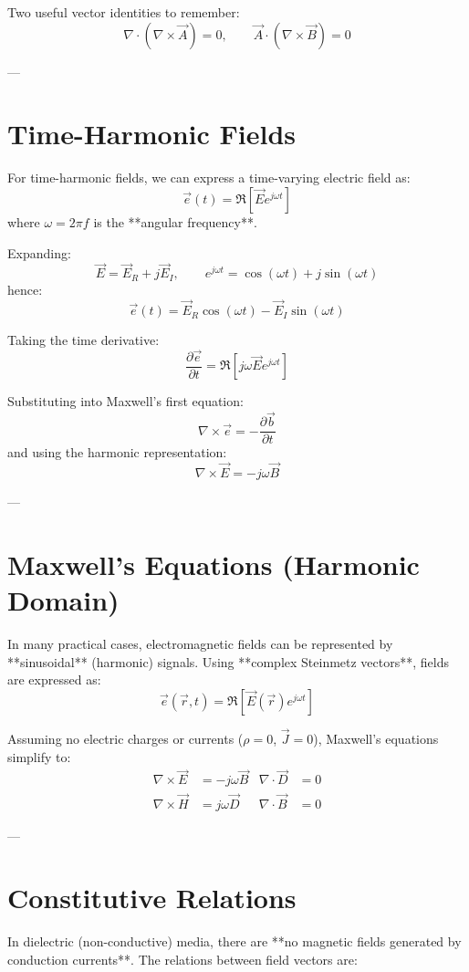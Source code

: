 Two useful vector identities to remember:
\[
\nabla \cdot (\nabla \times \vec{A}) = 0,
\qquad
\vec{A} \cdot (\nabla \times \vec{B}) = 0
\]

---

\section*{Time-Harmonic Fields}

For time-harmonic fields, we can express a time-varying electric field as:
\[
\vec{e}(t) = \Re \left[ \vec{E} e^{j\omega t} \right]
\]
where $\omega = 2\pi f$ is the **angular frequency**.

Expanding:
\[
\vec{E} = \vec{E}_R + j\vec{E}_I, \qquad
e^{j\omega t} = \cos(\omega t) + j\sin(\omega t)
\]
hence:
\[
\vec{e}(t) = \vec{E}_R \cos(\omega t) - \vec{E}_I \sin(\omega t)
\]

Taking the time derivative:
\[
\frac{\partial \vec{e}}{\partial t} = 
\Re \left[ j\omega \vec{E} e^{j\omega t} \right]
\]

Substituting into Maxwell’s first equation:
\[
\nabla \times \vec{e} = -\frac{\partial \vec{b}}{\partial t}
\]
and using the harmonic representation:
\[
\nabla \times \vec{E} = -j\omega \vec{B}
\]

---

\section*{Maxwell’s Equations (Harmonic Domain)}

In many practical cases, electromagnetic fields can be represented by **sinusoidal** (harmonic) signals.  
Using **complex Steinmetz vectors**, fields are expressed as:
\[
\vec{e}(\vec{r}, t) = \Re [ \vec{E}(\vec{r}) e^{j\omega t} ]
\]

Assuming no electric charges or currents ($\rho = 0$, $\vec{J} = 0$), Maxwell’s equations simplify to:
\begin{align}
\nabla \times \vec{E} &= -j\omega \vec{B} &
\nabla \cdot \vec{D} &= 0 \\
\nabla \times \vec{H} &= j\omega \vec{D} &
\nabla \cdot \vec{B} &= 0
\end{align}

---

\section*{Constitutive Relations}

In dielectric (non-conductive) media, there are **no magnetic fields generated by conduction currents**.  
The relations between field vectors are:

